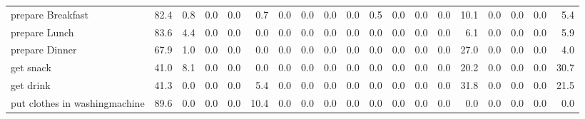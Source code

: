 \documentclass{article}
\begin{document}
\begin{sideways}
\begin{tabular}{lrrrrrrrrrrrrrrrrrr}
prepare Breakfast             &        82.4 &                0.8 &           0.0 &                          0.0 &                0.7 &                0.0 &                        0.0 &          0.0 &              0.0 &                0.5 &                    0.0 &                      0.0 &                  0.0 &                  10.1 &              0.0 &              0.0 &                                  0.0 &          5.4 \\
prepare Lunch                 &        83.6 &                4.4 &           0.0 &                          0.0 &                0.0 &                0.0 &                        0.0 &          0.0 &              0.0 &                0.0 &                    0.0 &                      0.0 &                  0.0 &                   6.1 &              0.0 &              0.0 &                                  0.0 &          5.9 \\
prepare Dinner                &        67.9 &                1.0 &           0.0 &                          0.0 &                0.0 &                0.0 &                        0.0 &          0.0 &              0.0 &                0.0 &                    0.0 &                      0.0 &                  0.0 &                  27.0 &              0.0 &              0.0 &                                  0.0 &          4.0 \\
get snack                     &        41.0 &                8.1 &           0.0 &                          0.0 &                0.0 &                0.0 &                        0.0 &          0.0 &              0.0 &                0.0 &                    0.0 &                      0.0 &                  0.0 &                  20.2 &              0.0 &              0.0 &                                  0.0 &         30.7 \\
get drink                     &        41.3 &                0.0 &           0.0 &                          0.0 &                5.4 &                0.0 &                        0.0 &          0.0 &              0.0 &                0.0 &                    0.0 &                      0.0 &                  0.0 &                  31.8 &              0.0 &              0.0 &                                  0.0 &         21.5 \\
put clothes in washingmachine &        89.6 &                0.0 &           0.0 &                          0.0 &               10.4 &                0.0 &                        0.0 &          0.0 &              0.0 &                0.0 &                    0.0 &                      0.0 &                  0.0 &                   0.0 &              0.0 &              0.0 &                                  0.0 &          0.0 \\

\end{tabular}
\end{sideways}
\end{document}
